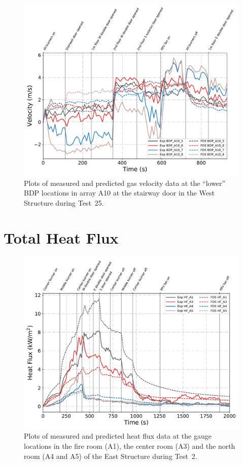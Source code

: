 \begin{figure}[!h]
	\centering
	\includegraphics[width=\columnwidth]{Figures/Plots/Validation/Velocity/Test_25_BDP_A10_lower}
	\caption[Plots of measured and predicted gas velocity data at ``lower'' BDP locations in A10 during Test~25.]{Plots of measured and predicted gas velocity data at the ``lower'' BDP locations in array A10 at the stairway door in the West Structure during Test~25.}
	\label{fig:Test25_lower_BDPs}
\end{figure}

\clearpage
\section{Total Heat Flux}

\begin{figure}[!h]
	\centering
	\includegraphics[width=\columnwidth]{Figures/Plots/Validation/Heat_Flux/Test_2_HFs}
	\caption[Plots of measured and predicted heat flux data during Test~2.]{Plots of measured and predicted heat flux data at the gauge locations in the fire room (A1), the center room (A3) and the north room (A4 and A5) of the East Structure during Test~2.}
	\label{fig:Test2_HFs}
\end{figure}

